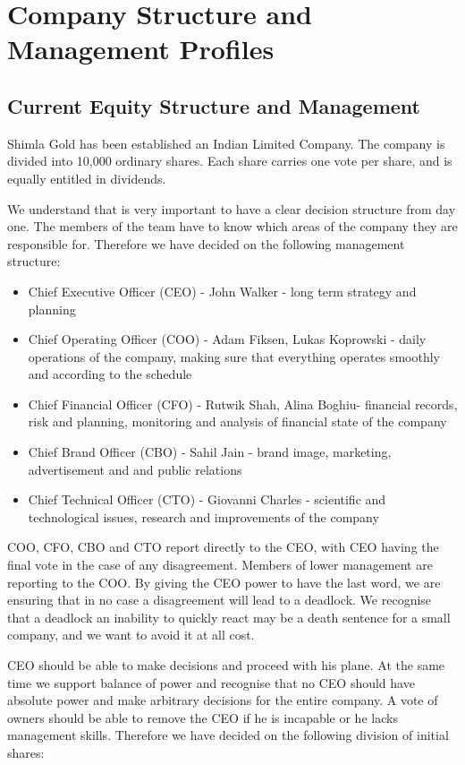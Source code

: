 \documentclass[11pt]{article}
\begin{document}
\section{Company Structure and Management Profiles}

  \subsection{Current Equity Structure and Management}
Shimla Gold has been established an Indian Limited Company. The company is 
divided into 10,000 ordinary shares. Each share carries one vote per share, 
and is equally entitled in dividends.

We understand that is very important to have a clear decision structure from 
day one. The members of the team have to know which areas of the company they 
are responsible for. Therefore we have decided on the following management
structure:

  \begin{itemize}
  \item Chief Executive Officer (CEO) - John Walker - 
long term strategy and planning
  \item Chief Operating Officer (COO) - Adam Fiksen, Lukas Koprowski - 
daily operations of the company, making sure that everything operates smoothly 
and according to the schedule
  \item Chief Financial Officer (CFO) - Rutwik Shah, Alina Boghiu- 
financial records, risk and planning, monitoring and analysis of financial 
state of the company
  \item Chief Brand Officer (CBO) - Sahil Jain -
 brand image, marketing, advertisement and and public relations
  \item Chief Technical Officer (CTO) - Giovanni Charles - 
scientific and technological issues, research and improvements of the company
  \end{itemize}

COO, CFO, CBO and CTO report directly to the CEO, with CEO having the final vote
in the case of any disagreement. Members of lower management are reporting to 
the COO. By giving the CEO power to have the last word, we are ensuring that in 
no case a disagreement will lead to a deadlock. We recognise that a deadlock an 
inability to quickly react may be a death sentence for a small company, and we 
want to avoid it at all cost.

CEO should be able to make decisions and proceed with his plane. At the same 
time we support balance of power and recognise that no CEO should have absolute 
power and make arbitrary decisions for the entire company. A vote of owners 
should be able to remove the CEO if he is incapable or he lacks management 
skills. Therefore we have decided on the following division of initial shares:
\end{document}
